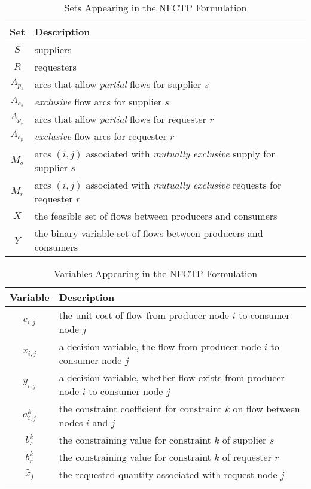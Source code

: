 \begin{table} [h!]
\centering
\begin{tabularx}{\columnwidth-10pt}{|c|X|} %
\hline
Set         & Description \\
\hline
$S$     & suppliers \\
$R$     & requesters \\
$A_{p_s}$     & arcs that allow \textit{partial} flows for supplier $s$ \\
$A_{e_s}$     & \textit{exclusive} flow arcs for supplier $s$ \\
$A_{p_p}$     & arcs that allow \textit{partial} flows for requester $r$ \\
$A_{e_p}$     & \textit{exclusive} flow arcs for requester $r$ \\
$M_s$     & arcs $(i, j)$ associated with \textit{mutually exclusive} supply for supplier $s$ \\
$M_r$     & arcs $(i, j)$ associated with \textit{mutually exclusive} requests for requester $r$ \\
$X$         & the feasible set of flows between producers and consumers  \\
$Y$         & the binary variable set of flows between producers and consumers  \\
\hline
\end{tabularx}
\caption{Sets Appearing in the NFCTP Formulation}
\label{tbl:NFCTP-sets}
\end{table}

\begin{table} [h!]
\centering
\begin{tabularx}{\columnwidth-10pt}{|c|X|} %
\hline
Variable    & Description \\
\hline
$c_{i,j}$             & the unit cost of flow
                          from producer node $i$ to consumer node $j$  \\
$x_{i,j}$             & a decision variable, the flow 
                          from producer node $i$ to consumer node $j$  \\
$y_{i,j}$             & a decision variable, whether flow exists 
                          from producer node $i$ to consumer node $j$  \\
$a_{i,j}^k$ & the constraint coefficient for constraint $k$ 
                          on flow between nodes $i$ and $j$  \\
$b_s^k$   & the constraining value for constraint $k$ of supplier $s$ \\
$b_r^k$   & the constraining value for constraint $k$ of requester $r$ \\
$\tilde{x_j}$ & the requested quantity associated with request node $j$ \\
\hline
\end{tabularx}
\caption{Variables Appearing in the NFCTP Formulation}
\label{tbl:NFCTP-vars}
\end{table}

